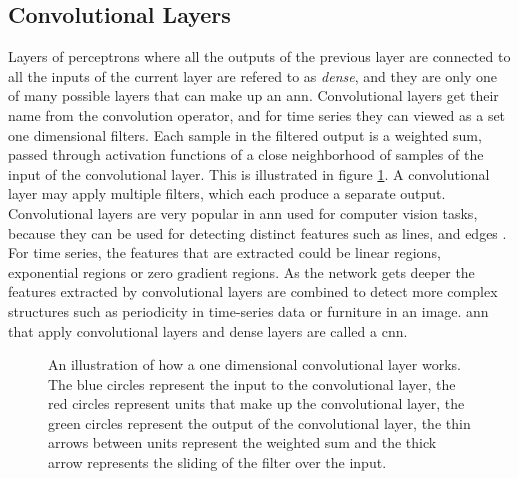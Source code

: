 \subsection{Convolutional Layers}
Layers of perceptrons where all the outputs of the previous layer are connected to all the inputs of the current layer are refered to as \textit{dense}, and they are only one of many possible layers that can make up an \acrshort{ann}. Convolutional layers get their name from the convolution operator, and for time series they can viewed as a set one dimensional filters. Each sample in the filtered output is a weighted sum, passed through activation functions of a close neighborhood of samples of the input of the convolutional layer. This is illustrated in figure \ref{fig:conv}. A convolutional layer may apply multiple filters, which each produce a separate output. Convolutional layers are very popular in \acrshort{ann} used for computer vision tasks, because they can be used for detecting distinct features such as lines, and edges \cite{dl_book}. For time series, the features that are extracted could be linear regions, exponential regions or zero gradient regions. As the network gets deeper the features extracted by convolutional layers are combined to detect more complex structures such as periodicity in time-series data or furniture in an image. \acrshort{ann} that apply convolutional layers and dense layers are called a \acrfull{cnn}.

\begin{figure}
    \centering
    
    \caption{An illustration of how a one dimensional convolutional layer works. The blue circles represent the input to the convolutional layer, the red circles represent units that make up the convolutional layer, the green circles represent the output of the convolutional layer, the thin arrows between units represent the weighted sum and the thick arrow represents the sliding of the filter over the input.}
    \label{fig:conv}
\end{figure}

